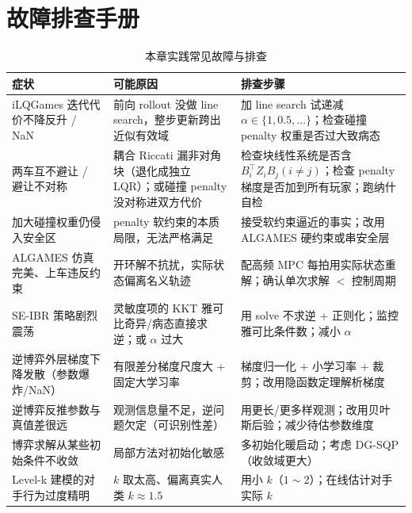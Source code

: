 \section*{故障排查手册}
\begin{table}[H]\centering\small
\caption{本章实践常见故障与排查}
\label{tab:rtg-troubleshooting}
\begin{tabular}{p{} p{} p{}}
\toprule
症状 & 可能原因 & 排查步骤 \\
\midrule
iLQGames 迭代代价不降反升 / NaN & 前向 rollout 没做 line search，整步更新跨出近似有效域 & 加 line search 试递减 $\alpha\in\{1,0.5,\dots\}$；检查碰撞 penalty 权重是否过大致病态 \\
两车互不避让 / 避让不对称 & 耦合 Riccati 漏非对角块（退化成独立 LQR）；或碰撞 penalty 没对称进双方代价 & 检查块线性系统是否含 $B_i^\top Z_iB_j(i\ne j)$；检查 penalty 梯度是否加到所有玩家；跑纳什自检 \\
加大碰撞权重仍侵入安全区 & penalty 软约束的本质局限，无法严格满足 & 接受软约束逼近的事实；改用 ALGAMES 硬约束或串安全层 \\
ALGAMES 仿真完美、上车违反约束 & 开环解不抗扰，实际状态偏离名义轨迹 & 配高频 MPC 每拍用实际状态重解；确认单次求解 $<$ 控制周期 \\
SE-IBR 策略剧烈震荡 & 灵敏度项的 KKT 雅可比奇异/病态直接求逆；或 $\alpha$ 过大 & 用 solve 不求逆 + 正则化；监控雅可比条件数；减小 $\alpha$ \\
逆博弈外层梯度下降发散（参数爆炸/NaN） & 有限差分梯度尺度大 + 固定大学习率 & 梯度归一化 + 小学习率 + 裁剪；改用隐函数定理解析梯度 \\
逆博弈反推参数与真值差很远 & 观测信息量不足，逆问题欠定（可识别性差） & 用更长/更多样观测；改用贝叶斯后验；减少待估参数维度 \\
博弈求解从某些初始条件不收敛 & 局部方法对初始化敏感 & 多初始化暖启动；考虑 DG-SQP（收敛域更大） \\
Level-k 建模的对手行为过度精明 & $k$ 取太高、偏离真实人类 $k\approx1.5$ & 用小 $k$（$1\sim2$）；在线估计对手实际 $k$ \\
\bottomrule
\end{tabular}
\end{table}
